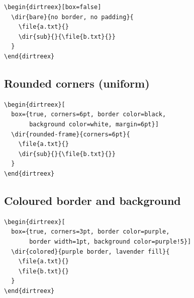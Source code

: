 \documentclass[11pt]{article}
\begin{document}
\begin{Verbatim}
\begin{dirtreex}[box=false]
  \dir{bare}{no border, no padding}{
    \file{a.txt}{}
    \dir{sub}{}{\file{b.txt}{}}
  }
\end{dirtreex}
\end{Verbatim}

\begin{dirtreex}[box=false]
\end{dirtreex}

\subsection{Rounded corners (uniform)}

\begin{Verbatim}
\begin{dirtreex}[
  box={true, corners=6pt, border color=black,
       background color=white, margin=6pt}]
  \dir{rounded-frame}{corners=6pt}{
    \file{a.txt}{}
    \dir{sub}{}{\file{b.txt}{}}
  }
\end{dirtreex}
\end{Verbatim}

\begin{dirtreex}[
  box={true, corners=6pt, border color=black,
       background color=white, margin=6pt}]
\end{dirtreex}

\subsection{Coloured border and background}

\begin{Verbatim}
\begin{dirtreex}[
  box={true, corners=3pt, border color=purple,
       border width=1pt, background color=purple!5}]
  \dir{colored}{purple border, lavender fill}{
    \file{a.txt}{}
    \file{b.txt}{}
  }
\end{dirtreex}
\end{Verbatim}

\begin{dirtreex}[
  box={true, corners=3pt, border color=purple,
       border width=1pt, background color=purple!5}]
\end{dirtreex}
\end{document}
